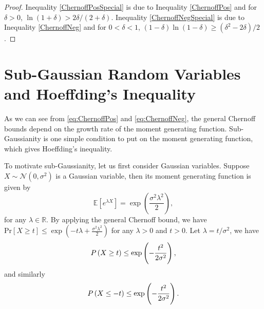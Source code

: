 \documentclass[openany]{book}
\theoremstyle{definition}
\theoremstyle{remark}
\begin{document}
\begin{proof}
    Inequality \eqref{ChernoffPosSpecial} is due to Inequality \eqref{ChernoffPos} and for $\delta>0$, $\ln(1+\delta)>2\delta/(2+\delta)$. Inequality \eqref{ChernoffNegSpecial} is due to Inequality \eqref{ChernoffNeg} and for $0<\delta<1$, $(1-\delta)\ln(1-\delta)\ge(\delta^2-2\delta)/2$.
\end{proof}

\section{Sub-Gaussian Random Variables and Hoeffding's Inequality}
As we can see from \eqref{eq:ChernoffPos} and \eqref{eq:ChernoffNeg}, the general Chernoff bounds depend on the growth rate of the moment generating function. Sub-Gaussianity is one simple condition to put on the moment generating function, which gives Hoeffding's inequality.

To motivate sub-Gaussianity, let us first consider Gaussian variables. Suppose $X\sim \mathcal{N}(0,\sigma^2)$ is a Gaussian variable, then its moment generating function is given by
\begin{equation*}
    \mathbb{E}\left[e^{\lambda X}\right]=\exp\left(\frac{\sigma^2\lambda^2}{2}\right),
\end{equation*}
for any $\lambda\in \mathbb{R}$. By applying the general Chernoff bound, we have $\mathrm{Pr}[X\ge t]\le \exp\left(-t\lambda+\frac{\sigma^2\lambda^2}{2}\right)$ for any $\lambda>0$ and $t>0$. Let $\lambda=t/\sigma^2$, we have
\begin{equation*}
    P\del{X\ge t}\le \exp\left(-\frac{t^2}{2\sigma^2}\right),
\end{equation*}
and similarly
\begin{equation*}
    P\del{X\le-t}\le\exp\left(-\frac{t^2}{2\sigma^2}\right).
\end{equation*}
\end{document}
